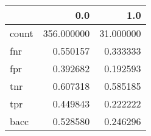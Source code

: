 \begin{tabular}{lrr}
\toprule
{} &         0.0 &        1.0 \\
\midrule
count &  356.000000 &  31.000000 \\
fnr   &    0.550157 &   0.333333 \\
fpr   &    0.392682 &   0.192593 \\
tnr   &    0.607318 &   0.585185 \\
tpr   &    0.449843 &   0.222222 \\
bacc  &    0.528580 &   0.246296 \\
\bottomrule
\end{tabular}
